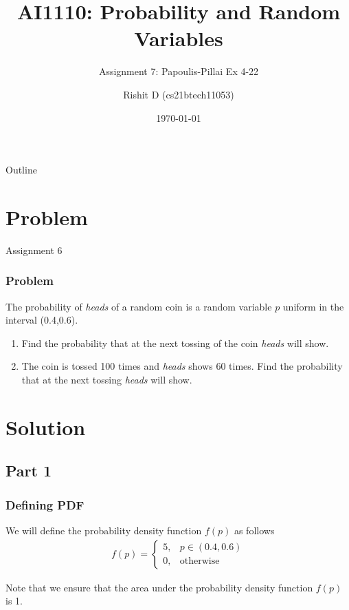 \documentclass{beamer}
\title{AI1110: Probability and Random Variables}
\subtitle{Assignment 7: Papoulis-Pillai Ex 4-22}
\author{Rishit D (cs21btech11053)}
\institute{IIT Hyderabad}
\date{\today}
\begin{document}
\begin{frame}
    \titlepage 
\end{frame}

\begin{frame}{Outline}
    \tableofcontents
\end{frame}

\section{Problem}

\begin{frame}{Assignment 6}
  \frametitle{Problem}
  The probability of \emph{heads} of a random coin is a random variable $p$ uniform in the interval (0.4,0.6).
  \begin{enumerate}
  \item Find the probability that at the next tossing of the coin \emph{heads} will show.
  \item The coin is tossed 100 times and \emph{heads} shows 60 times. Find the probability that at the
next tossing \emph{heads} will show.
  \end{enumerate}
\end{frame}

\section{Solution}
\subsection{Part 1}

\begin{frame}
  \frametitle{Defining PDF}
  We will define the probability density function $f(p)$ as follows 
  \begin{align}
    f(p) = 
    \begin{cases}
      5, & p \in (0.4, 0.6) \\
      0, & \text{otherwise}
    \end{cases}
    \label{eq:Dis1}
  \end{align}

  Note that we ensure that the area under the probability density function $f(p)$ is 1.
\end{frame}
\end{document}
